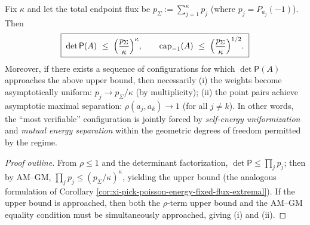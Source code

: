 \begin{corollary}\label{cor:xi-anchored-capacity-extremal-fixed-flux}
Fix \(\kappa\) and let the total endpoint flux be \(p_{\Sigma}:=\sum_{j=1}^{\kappa}p_j\) (where \(p_j=P_{a_j}(-1)\)).
Then
\[
\boxed{\;
\det\mathsf P(A)\ \le\ \Bigl(\frac{p_{\Sigma}}{\kappa}\Bigr)^{\kappa},\qquad
\mathrm{cap}_{-1}(A)\ \le\ \Bigl(\frac{p_{\Sigma}}{\kappa}\Bigr)^{1/2}.\;}
\]
Moreover, if there exists a sequence of configurations for which \(\det\mathsf P(A)\) approaches the above upper bound, then necessarily
(i) the weights become asymptotically uniform: \(p_j\to p_{\Sigma}/\kappa\) (by multiplicity);
(ii) the point pairs achieve asymptotic maximal separation: \(\rho(a_j,a_k)\to 1\) (for all \(j\neq k\)).
In other words, the ``most verifiable'' configuration is jointly forced by \emph{self-energy uniformization} and \emph{mutual energy separation} within the geometric degrees of freedom permitted by the regime.
\end{corollary}
\begin{proof}[Proof outline]
From \(\rho\le 1\) and the determinant factorization, \(\det\mathsf P\le\prod_j p_j\);
then by AM--GM, \(\prod_j p_j\le (p_{\Sigma}/\kappa)^{\kappa}\), yielding the upper bound (the analogous formulation of Corollary \ref{cor:xi-pick-poisson-energy-fixed-flux-extremal}).
If the upper bound is approached, then both the \(\rho\)-term upper bound and the AM--GM equality condition must be simultaneously approached, giving (i) and (ii). \qedhere
\end{proof}

